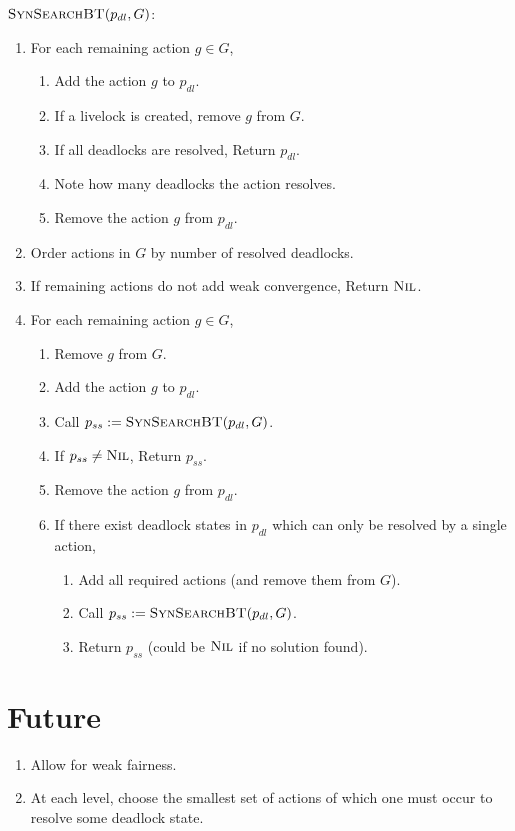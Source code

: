 $\text{\normalfont\scshape SynSearchBT}(p_{dl}, G)$:
\begin{enumerate}
 \item For each remaining action $g\in G$,
  \begin{enumerate}
   \item Add the action $g$ to $p_{dl}$.
   \item If a livelock is created, remove $g$ from $G$.
   \item If all deadlocks are resolved, Return $p_{dl}$.
   \item Note how many deadlocks the action resolves.
   \item Remove the action $g$ from $p_{dl}$.
  \end{enumerate}
 \item Order actions in $G$ by number of resolved deadlocks.
 \item If remaining actions do not add weak convergence, Return $\text{\normalfont\scshape Nil}$.
 \item For each remaining action $g\in G$,
  \begin{enumerate}
   \item Remove $g$ from $G$.
   \item Add the action $g$ to $p_{dl}$.
   \item Call $p_{ss} := \text{\normalfont\scshape SynSearchBT}(p_{dl}, G)$.
   \item If $p_{ss}\neq \text{\normalfont\scshape Nil}$, Return $p_{ss}$.
   \item Remove the action $g$ from $p_{dl}$.
   \item If there exist deadlock states in $p_{dl}$ which can only be resolved by a single action,
    \begin{enumerate}
     \item Add all required actions (and remove them from $G$).
     \item Call $p_{ss} := \text{\normalfont\scshape SynSearchBT}(p_{dl}, G)$.
     \item Return $p_{ss}$ (could be $\text{\normalfont\scshape Nil}$ if no solution found).
    \end{enumerate}
  \end{enumerate}
\end{enumerate}

\section{Future}
\begin{enumerate}
 \item Allow for weak fairness.
 \item At each level, choose the smallest set of actions of which one must occur to resolve some deadlock state.
\end{enumerate}



